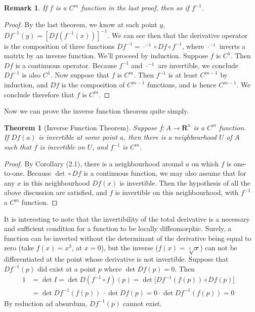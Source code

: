 \documentclass[12pt]{amsbook}
\theoremstyle{plain}
\newtheorem{theorem}{Theorem}
\newtheorem{remark}{Remark}
\theoremstyle{definition}
\begin{document}
\begin{remark}
    If $f$ is a $C^m$ function in the last proof, then so if $f^{-1}$.
\end{remark}
\begin{proof}
    By the last theorem, we know at each point $y$, $Df^{-1}(y) = [Df(f^{-1}(x))]^{-1}$. We can see then that the derivative operator is the composition of three functions $Df^{-1} = \cdot^{-1} \circ Df \circ f^{-1}$, where $\cdot^{-1}$ inverts a matrix by an inverse function. We'll proceed by induction. Suppose $f$ is $C^1$. Then $Df$ is a continuous operator. Because $f^{-1}$ and $\cdot^{-1}$ are invertible, we conclude $Df^{-1}$ is also $C^1$. Now suppose that $f$ is $C^m$. Then $f^{-1}$ is at least $C^{m-1}$ by induction, and $Df$ is the composition of $C^{m-1}$ functions, and is hence $C^{m-1}$. We conclude therefore that $f$ is $C^m$.
\end{proof}

Now we can prove the inverse function theorem quite simply.

\begin{theorem}[Inverse Function Theorem]
    Suppose $f:A \to \mathbf{R}^{n}$ is a $C^m$ function. If $Df(a)$ is invertible at some point $a$, then there is a neighbourhood $U$ of $A$ such that $f$ is invertible on $U$, and $f^{-1}$ is $C^m$.
\end{theorem}
\begin{proof}
    By Corollary (2.1), there is a neighbourhood around $a$ on which $f$ is one-to-one. Because $\det \circ Df$ is a continuous function, we may also assume that for any $x$ in this neighbourhood $Df(x)$ is invertible. Then the hypothesis of all the above discussion are satisfied, and $f$ is invertible on this neighbourhood, with $f^{-1}$ a $C^m$ function.
\end{proof}

It is interesting to note that the invertibility of the total derivative is a necessary and sufficient condition for a function to be locally diffeomorphic. Surely, a function can be inverted without the determinant of the derivative being equal to zero (take $f(x) = x^3$, at $x = 0$), but the inverse ($f(x) = \sqrt[3]{x}$) can not be differentiated at the point whose derivative is not invertible. Suppose that $Df^{-1}(p)$ did exist at a point $p$ where $\det Df(p) = 0$. Then
%
\begin{align*}
    1 &= \det I = \det D(f^{-1} \circ f)(p) = \det \big[ Df^{-1}(f(p)) \circ Df(p) \big]\\
    &= \det Df^{-1}(f(p))\ \cdot \det Df(p) = 0 \cdotp \det Df^{-1}(f(p)) = 0
\end{align*}
%
By reduction ad absurdum, $Df^{-1}(p)$ cannot exist.
\end{document}
